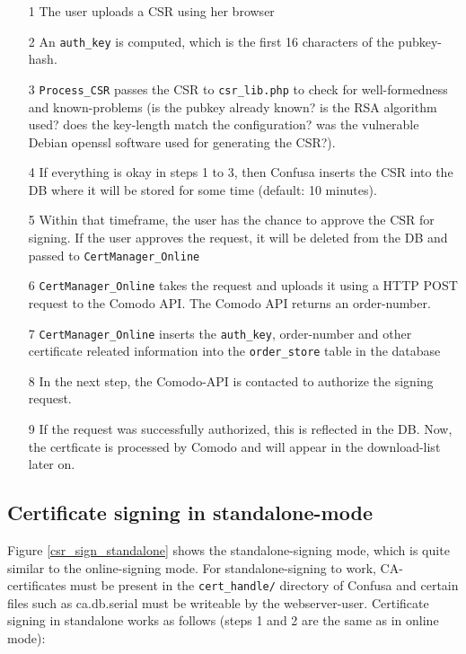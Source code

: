 \documentclass{scrartcl}
\begin{document}
\begin{enumerate}
	\item[1] The user uploads a CSR using her browser
	\item[2] An \verb+auth_key+ is computed, which is the first 16 characters of the pubkey-hash.
	\item[3] \verb+Process_CSR+ passes the CSR to \verb+csr_lib.php+ to check for well-formedness and known-problems (is the pubkey already known? is the RSA algorithm used? does the key-length match the configuration? was the vulnerable Debian openssl software used for generating the CSR?).
	\item[4] If everything is okay in steps 1 to 3, then Confusa inserts the CSR into the DB where it will be stored for some time (default: 10 minutes).
	\item[5] Within that timeframe, the user has the chance to approve the CSR for signing. If the user approves the request, it will be deleted from the DB and passed to \verb+CertManager_Online+
	\item[6] \verb+CertManager_Online+ takes the request and uploads it using a HTTP POST request to the Comodo API. The Comodo API returns an order-number.
	\item[7] \verb+CertManager_Online+ inserts the \verb+auth_key+, order-number and other certificate releated information into the \verb+order_store+ table in the database
	\item[8] In the next step, the Comodo-API is contacted to authorize the signing request.
	\item[9] If the request was successfully authorized, this is reflected in the DB. Now, the certficate is processed by Comodo and will appear in the download-list later on.
\end{enumerate}

\subsection{Certificate signing in standalone-mode}

Figure \ref{csr_sign_standalone} shows the standalone-signing mode, which is quite similar to the online-signing mode. For standalone-signing to work, CA-certificates must be present in the \verb+cert_handle/+ directory of Confusa and certain files such as ca.db.serial must be writeable by the webserver-user.
Certificate signing in standalone works as follows (steps 1 and 2 are the same as in online mode):
\end{document}
